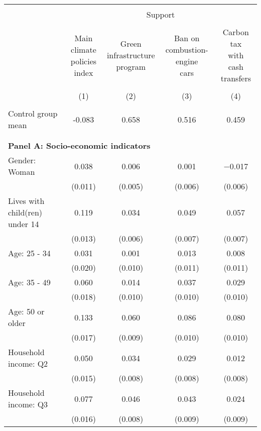 
\begin{tabular}{@{\extracolsep{5pt}}lcccc} 
\\[-1.8ex]\hline 
\hline \\[-1.8ex] 
 & \multicolumn{4}{c}{Support} \\ 
\cline{2-5} 
\\[-1.8ex] & \makecell{Main climate\\policies index} & \makecell{Green\\infrastructure\\program} & \makecell{Ban on\\combustion-engine\\cars} & \makecell{Carbon tax\\with\\cash transfers} \\ 
\\[-1.8ex] & (1) & (2) & (3) & (4)\\ 
\hline \\[-1.8ex] 
Control group mean & -0.083 & 0.658 & 0.516 & 0.459  \\ \hline \\[-1.8ex]
\\[1ex]
\multicolumn{ 5 }{l}{\textbf{ Panel A: Socio-economic indicators }} \\
 Gender: Woman & 0.038 & 0.006 & 0.001 & $-$0.017 \\ 
  & (0.011) & (0.005) & (0.006) & (0.006) \\ 
  Lives with child(ren) under 14 & 0.119 & 0.034 & 0.049 & 0.057 \\ 
  & (0.013) & (0.006) & (0.007) & (0.007) \\ 
  Age: 25 - 34 & 0.031 & 0.001 & 0.013 & 0.008 \\ 
  & (0.020) & (0.010) & (0.011) & (0.011) \\ 
  Age: 35 - 49 & 0.060 & 0.014 & 0.037 & 0.029 \\ 
  & (0.018) & (0.010) & (0.010) & (0.010) \\ 
  Age: 50 or older & 0.133 & 0.060 & 0.086 & 0.080 \\ 
  & (0.017) & (0.009) & (0.010) & (0.010) \\ 
  Household income: Q2 & 0.050 & 0.034 & 0.029 & 0.012 \\ 
  & (0.015) & (0.008) & (0.008) & (0.008) \\ 
  Household income: Q3 & 0.077 & 0.046 & 0.043 & 0.024 \\ 
  & (0.016) & (0.008) & (0.009) & (0.009) \\ 

\end{tabular}
